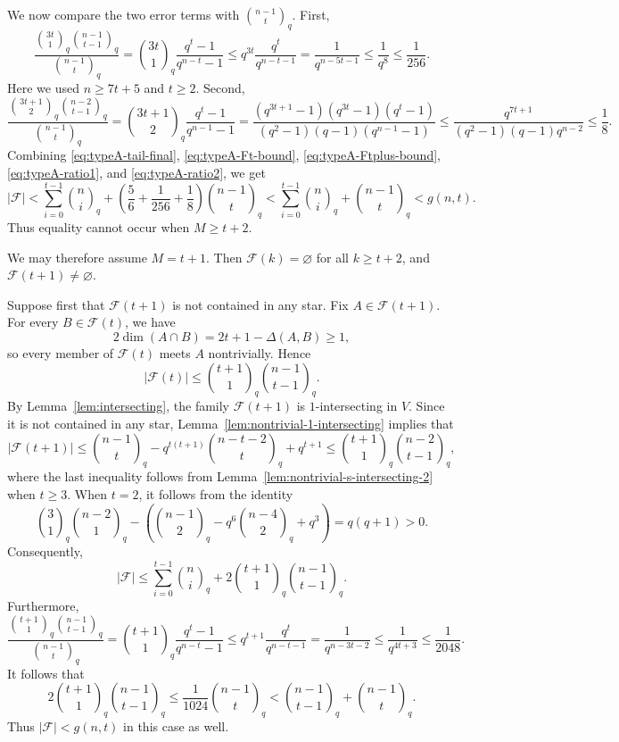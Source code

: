 \documentclass[11pt]{article}
\theoremstyle{definition}
\newcommand{\qbinom}[2]{\genfrac{(}{)}{0pt}{}{#1}{#2}_q}
\begin{document}
We now compare the two error terms with $\qbinom{n-1}{t}$. 
First,
\begin{equation}\label{eq:typeA-ratio1}
\frac{\qbinom{3t}{1}\qbinom{n-1}{t-1}}{\qbinom{n-1}{t}}
=
\qbinom{3t}{1}\frac{q^t-1}{q^{n-t}-1} \le
q^{3t}\frac{q^t}{q^{n-t-1}}
=
\frac{1}{q^{n-5t-1}}
\le \frac{1}{q^8}
\le \frac{1}{256}.
\end{equation}
Here we used $n\ge 7t+5$ and $t\ge 2$. 
Second,
\begin{equation}\label{eq:typeA-ratio2}
    \frac{\qbinom{3t+1}{2}\qbinom{n-2}{t-1}}{\qbinom{n-1}{t}}
=
\qbinom{3t+1}{2}
\frac{q^t-1}{q^{n-1}-1}
=
\frac{(q^{3t+1}-1)(q^{3t}-1)(q^t-1)}
{(q^2-1)(q-1)(q^{n-1}-1)} 
\le
\frac{q^{7t+1}}{(q^2-1)(q-1)q^{n-2}}
\le
\frac{1}{8}.
\end{equation}
Combining \eqref{eq:typeA-tail-final}, \eqref{eq:typeA-Ft-bound}, \eqref{eq:typeA-Ftplus-bound}, \eqref{eq:typeA-ratio1}, and \eqref{eq:typeA-ratio2}, we get
\[
|\mathcal F|
<
\sum_{i=0}^{t-1}\qbinom{n}{i}
+
\left(\frac56+\frac{1}{256}+\frac18\right)\qbinom{n-1}{t}
<
\sum_{i=0}^{t-1}\qbinom{n}{i}
+
\qbinom{n-1}{t}
<
g(n,t).
\]
Thus equality cannot occur when $M\ge t+2$.

We may therefore assume $M=t+1$. 
Then $\mathcal F(k)=\varnothing$ for all $k\ge t+2$, and $\mathcal F(t+1)\neq\varnothing$.

Suppose first that $\mathcal F(t+1)$ is not contained in any star. 
Fix $A\in\mathcal F(t+1)$. 
For every $B\in\mathcal F(t)$, we have
\[
2\dim(A\cap B)=2t+1-\Delta(A,B)\ge 1,
\]
so every member of $\mathcal F(t)$ meets $A$ nontrivially. Hence
\begin{equation}\label{eq:typeA-case2-Ft}
|\mathcal F(t)|
\le
\qbinom{t+1}{1}\qbinom{n-1}{t-1}.
\end{equation}
By Lemma~\ref{lem:intersecting}, the family $\mathcal F(t+1)$ is $1$-intersecting in $V$. 
Since it is not contained in any star,  Lemma~\ref{lem:nontrivial-1-intersecting} implies that
\[
|\mathcal F(t+1)|
\le
\qbinom{n-1}{t}
-
q^{t(t+1)}\qbinom{n-t-2}{t}
+
q^{t+1}
\le
\qbinom{t+1}{1}\qbinom{n-2}{t-1},
\]
where the last inequality follows from Lemma~\ref{lem:nontrivial-s-intersecting-2} when \(t\ge3\). When \(t=2\), it follows from the identity
\[
\qbinom{3}{1}\qbinom{n-2}{1}
-
\left(
\qbinom{n-1}{2}
-
q^6\qbinom{n-4}{2}
+
q^3
\right)
=
q(q+1)>0.
\]
Consequently,
\[
|\mathcal F|
\le
\sum_{i=0}^{t-1}\qbinom{n}{i}
+
2\qbinom{t+1}{1}\qbinom{n-1}{t-1}.
\]
Furthermore,
\begin{equation}\label{eq:typeA-case2-ratio}
\frac{\qbinom{t+1}{1}\qbinom{n-1}{t-1}}{\qbinom{n-1}{t}}
=
\qbinom{t+1}{1}\frac{q^t-1}{q^{n-t}-1} \le
q^{t+1}\frac{q^t}{q^{n-t-1}}
=
\frac{1}{q^{n-3t-2}}
\le
\frac{1}{q^{4t+3}}
\le
\frac{1}{2048}.
\end{equation}
It follows that
\[
2\qbinom{t+1}{1}\qbinom{n-1}{t-1}
\le
\frac{1}{1024}\qbinom{n-1}{t}
<
\qbinom{n-1}{t-1}+\qbinom{n-1}{t}.
\]
Thus $|\mathcal F|<g(n,t)$ in this case as well.
\end{document}
